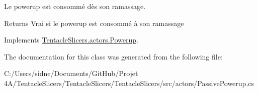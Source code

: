Le powerup est consommé dès son ramassage. 

\begin{DoxyReturn}{Returns}
Vrai si le powerup est consommé à son ramassage 
\end{DoxyReturn}


Implements \hyperlink{class_tentacle_slicers_1_1actors_1_1_powerup_a31b3367e7a72d80526d92486472d329d}{Tentacle\+Slicers.\+actors.\+Powerup}.



The documentation for this class was generated from the following file\+:\begin{DoxyCompactItemize}
\item 
C\+:/\+Users/sidne/\+Documents/\+Git\+Hub/\+Projet 4\+A/\+Tentacle\+Slicers/\+Tentacle\+Slicers/\+Tentacle\+Slicers/src/actors/Passive\+Powerup.\+cs\end{DoxyCompactItemize}
